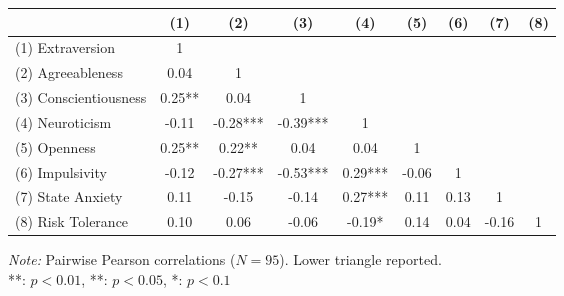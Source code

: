 \begingroup
\centering
\scriptsize
\setlength{\tabcolsep}{3pt}
\begin{tabular}{lcccccccc}
\toprule
  & (1) & (2) & (3) & (4) & (5) & (6) & (7) & (8) \\
\midrule
  (1) Extraversion & 1 &  &  &  &  &  &  &  \\
  (2) Agreeableness & 0.04 & 1 &  &  &  &  &  &  \\
  (3) Conscientiousness & 0.25** & 0.04 & 1 &  &  &  &  &  \\
  (4) Neuroticism & -0.11 & -0.28*** & -0.39*** & 1 &  &  &  &  \\
  (5) Openness & 0.25** & 0.22** & 0.04 & 0.04 & 1 &  &  &  \\
  (6) Impulsivity & -0.12 & -0.27*** & -0.53*** & 0.29*** & -0.06 & 1 &  &  \\
  (7) State Anxiety & 0.11 & -0.15 & -0.14 & 0.27*** & 0.11 & 0.13 & 1 &  \\
  (8) Risk Tolerance & 0.10 & 0.06 & -0.06 & -0.19* & 0.14 & 0.04 & -0.16 & 1 \\
\bottomrule
\end{tabular}
\par
\vspace{2pt}
{\footnotesize \textit{Note:} Pairwise Pearson correlations ($N = 95$). Lower triangle reported.}\\
{\footnotesize ***: $p<0.01$, **: $p<0.05$, *: $p<0.1$}
\endgroup
